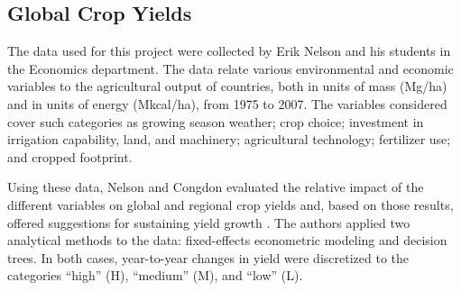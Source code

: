 \documentclass[11pt]{article}
\begin{document}
\subsection{Global Crop Yields}
The data used for this project were collected by Erik Nelson and his students in the Economics department. The data relate various environmental and economic variables to the agricultural output of countries, both in units of mass (Mg/ha) and in units of energy (Mkcal/ha), from 1975 to 2007. The variables considered cover such categories as growing season weather; crop choice; investment in irrigation capability, land, and machinery; agricultural technology; fertilizer use; and cropped footprint. 

Using these data, Nelson and Congdon evaluated the relative impact of the different variables on global and regional crop yields and, based on those results, offered suggestions for sustaining yield growth \cite{nelson_measuring_2016}. The authors applied two analytical methods to the data: fixed-effects econometric modeling and decision trees. In both cases, year-to-year changes in yield were discretized to the categories ``high'' (H), ``medium'' (M), and ``low'' (L). 


\end{document}
